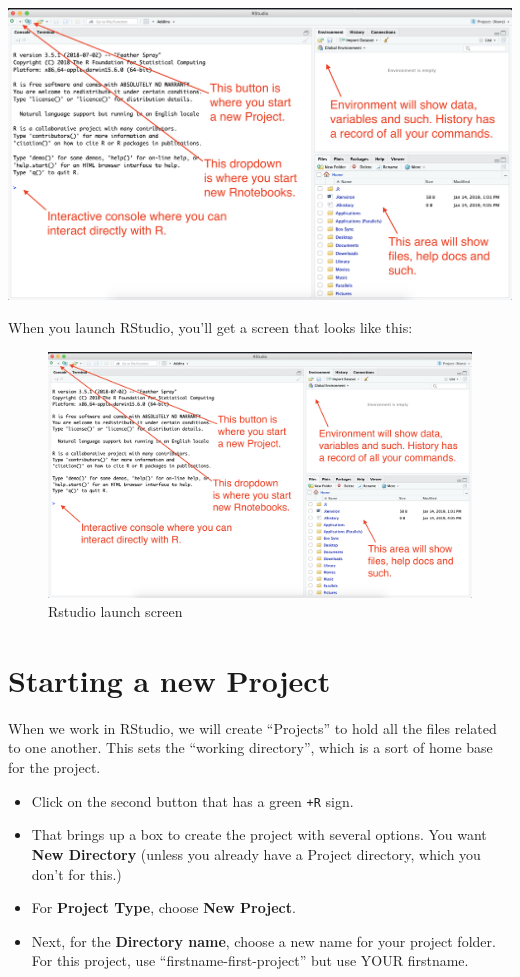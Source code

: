 \documentclass[]{book}
\providecommand{\tightlist}{%
  \setlength{\itemsep}{0pt}\setlength{\parskip}{0pt}}
\begin{document}
\includegraphics[width=0.5\linewidth]{_images/02-rstudio-start}

When you launch RStudio, you'll get a screen that looks like this:

\begin{figure}
\centering
\includegraphics[width=6.25000in]{_images/02-rstudio-start.png}
\caption{Rstudio launch screen}
\end{figure}

\section{Starting a new Project}\label{starting-a-new-project}

When we work in RStudio, we will create ``Projects'' to hold all the
files related to one another. This sets the ``working directory'', which
is a sort of home base for the project.

\begin{itemize}
\tightlist
\item
  Click on the second button that has a green \texttt{+R} sign.
\item
  That brings up a box to create the project with several options. You
  want \textbf{New Directory} (unless you already have a Project
  directory, which you don't for this.)
\item
  For \textbf{Project Type}, choose \textbf{New Project}.
\item
  Next, for the \textbf{Directory name}, choose a new name for your
  project folder. For this project, use ``firstname-first-project'' but
  use YOUR firstname.
\end{itemize}
\end{document}
